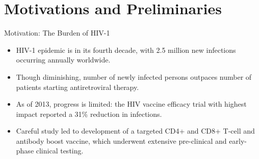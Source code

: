 \documentclass{beamer}
\begin{document}
\section{Motivations and Preliminaries}


\begin{frame}[c]{Motivation: The Burden of HIV-1}

\begin{center}
\begin{itemize}
  \itemsep10pt
  \item HIV-1 epidemic is in its fourth decade, with 2.5 million new infections
    occurring annually worldwide.
  \item Though diminishing, number of newly infected persons outpaces number of
    patients starting antiretroviral therapy.
  \item As of 2013, progress is limited: the HIV vaccine efficacy trial with
    highest impact reported a 31\% reduction in infections.
  \item Careful study led to development of a targeted CD4+ and CD8+ T-cell and
    antibody boost vaccine, which underwent extensive pre-clinical and
    early-phase clinical testing.
\end{itemize}
\end{center}

\note{
}

\end{frame}
\end{document}
